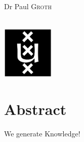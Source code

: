 \documentclass{article}
\newcommand{\red}[1]{{\color{red}{#1}}}
\begin{document}
\begin{titlepage}
\begin{minipage}[t]{0.4\textwidth}
\begin{flushright}
Dr Paul \textsc{Groth}\\

\end{flushright}

\end{minipage}\\[2cm]









\includegraphics[width=2.5cm]{data/images/uva.png}\\ %


 




\vfill %



\end{titlepage}

\tableofcontents
\listoftables
\newpage

\section*{Abstract}
We generate Knowledge! \cite{kipf_contrastive_2020}
\end{document}
